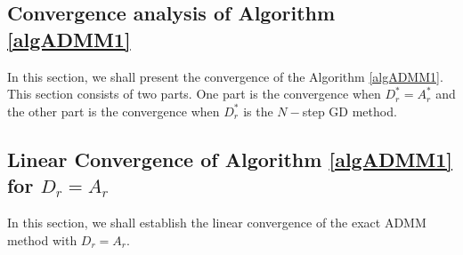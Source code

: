 \begin{itemize}
\begin{comment}
We remark that 
\begin{equation}
\frac{\kappa(G^{-m}) - 1}{\kappa(G^{-m}) + 1} = \frac{\frac{(r+L_F)^m}{(r+\lambda_F)^m} - 1}{\frac{(r+L_F)^m}{(r+\lambda_F)^m}+1} = \frac{(r+L_F)^m - (r+\lambda_F)^m}{(r+L_F)^m + (r+\lambda_F)^m}. 
\end{equation} 
This provides the convergence rate that speeds up with the larger $r$ now. 
\end{proof} 


\end{comment} 
 

\section{Convergence analysis of  Algorithm \ref{algADMM1}}

In this section, we shall present the convergence of the Algorithm \ref{algADMM1}. This section consists of two parts. One part is the convergence when $D_r^* = A_r^*$ and the other part is the convergence when $D_r^*$ is the $N-$step GD method. 

\subsection{Linear Convergence of Algorithm \ref{algADMM1} for $D_r = A_r$}

In this section, we shall establish the linear convergence of the exact ADMM method with $D_r = A_r$.
\begin{comment} 
\begin{lemma}
The following holds true: for all $Y, Y_k$ in $\Reals{N_x}$, 
\begin{eqnarray}
\|A_r^*(Y) - A_r^*(Y_k) \| &\leq& \frac{1}{r + \lambda_F} \|Y- Y_k\|, \\ 
\|(I - \omega A_r^*) (Y) - (I - \omega A_r^*) (Y_k)   \| &\leq& \left(1 - \frac{\omega}{r + L_F} \right) \|Y -Y_k \|
\end{eqnarray}
\end{lemma}
\begin{proof}
    Note that $A_r^*(Y)$ corresponds to the gradient of the function $F_r^*(Y)$ that is the dual of $F_r(X) = F(X) + \frac{r}{2} \| X\|^2$. 
    $F_r^*$ is $\frac{1}{r +L_F}$-strongly convex and $\frac{1}{r + \lambda_F}$-smooth since $F_r$ is $(r + \lambda)$-strongly convex and $(r + L_F)$-smooth.
    Therefore, we have 
    \begin{equation}
        \|A_r^*(Y) - A_r^*(Y_k) \| \leq \frac{1}{r + \lambda_F} \|Y - Y_k\|. 
    \end{equation}


\end{comment}
\end{itemize}
